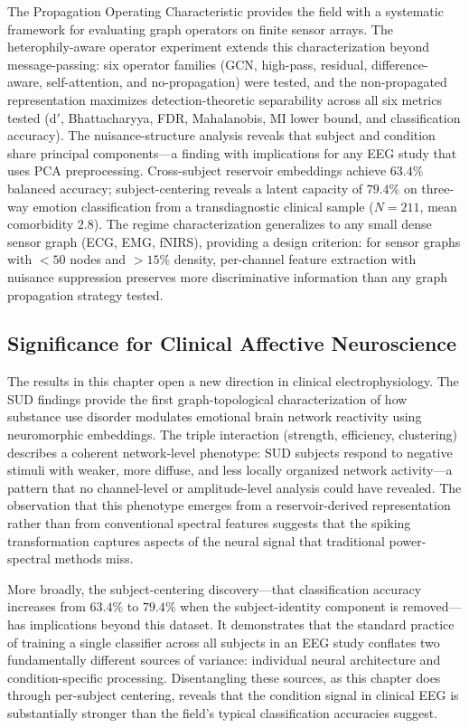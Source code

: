 The Propagation Operating Characteristic provides the field with a systematic framework for evaluating graph operators on finite sensor arrays. The heterophily-aware operator experiment extends this characterization beyond message-passing: six operator families (GCN, high-pass, residual, difference-aware, self-attention, and no-propagation) were tested, and the non-propagated representation maximizes detection-theoretic separability across all six metrics tested (d$'$, Bhattacharyya, FDR, Mahalanobis, MI lower bound, and classification accuracy). The nuisance-structure analysis reveals that subject and condition share principal components---a finding with implications for any EEG study that uses PCA preprocessing. Cross-subject reservoir embeddings achieve $63.4\%$ balanced accuracy; subject-centering reveals a latent capacity of $79.4\%$ on three-way emotion classification from a transdiagnostic clinical sample ($N = 211$, mean comorbidity $2.8$). The regime characterization generalizes to any small dense sensor graph (ECG, EMG, fNIRS), providing a design criterion: for sensor graphs with $< 50$ nodes and $> 15\%$ density, per-channel feature extraction with nuisance suppression preserves more discriminative information than any graph propagation strategy tested.

\subsection{Significance for Clinical Affective Neuroscience}

The results in this chapter open a new direction in clinical electrophysiology. The SUD findings provide the first graph-topological characterization of how substance use disorder modulates emotional brain network reactivity using neuromorphic embeddings. The triple interaction (strength, efficiency, clustering) describes a coherent network-level phenotype: SUD subjects respond to negative stimuli with weaker, more diffuse, and less locally organized network activity---a pattern that no channel-level or amplitude-level analysis could have revealed. The observation that this phenotype emerges from a reservoir-derived representation rather than from conventional spectral features suggests that the spiking transformation captures aspects of the neural signal that traditional power-spectral methods miss.

More broadly, the subject-centering discovery---that classification accuracy increases from $63.4\%$ to $79.4\%$ when the subject-identity component is removed---has implications beyond this dataset. It demonstrates that the standard practice of training a single classifier across all subjects in an EEG study conflates two fundamentally different sources of variance: individual neural architecture and condition-specific processing. Disentangling these sources, as this chapter does through per-subject centering, reveals that the condition signal in clinical EEG is substantially stronger than the field's typical classification accuracies suggest.


